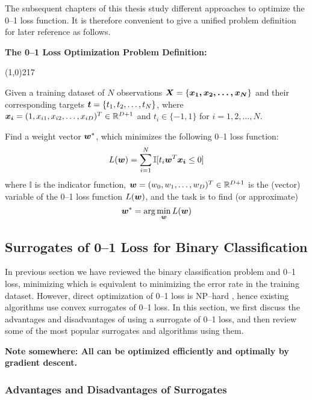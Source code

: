 The subsequent chapters of this thesis study different approaches to optimize the 0--1 loss function. It is therefore convenient to give a unified problem definition for later reference as follows.

\begin{framed}
\label{definition}
{\bf The 0--1 Loss Optimization Problem Definition:}

\line(1,0){217}

Given a training dataset of $N$ observations $\boldsymbol{X} = \{\boldsymbol{x_1, x_2, \dots, x_N}\}$ and their corresponding targets $\boldsymbol{t} = \{t_1, t_2, \dots, t_N\}$, where  $\boldsymbol{x_i} =  (1, x_{i1}, x_{i2}, \dots, x_{iD})^T \in \mathbb{R}^{D+1}$ and $t_i \in \{ -1, 1 \}$ for $i=1,2,\dots, N$. 

Find a weight vector $\boldsymbol{w}^*$, which minimizes the following 0--1 loss function:
\begin{equation}
\label{01loss}
L(\boldsymbol{w}) = \sum_{i=1}^N \mathbb{I} [t_i \boldsymbol{w}^T \boldsymbol{x_i} \leq 0]
\end{equation}
where $\mathbb{I}$ is the indicator function, ${\boldsymbol{w}} = (w_0, w_1, \dots, w_D)^T \in \mathbb{R}^{D+1}$ is the (vector) variable of the 0--1 loss function $L(\boldsymbol{w})$, and the task is to find (or approximate) 
$${\boldsymbol{w}}^* = \arg\min_{\boldsymbol{w}} L({\boldsymbol{w}})$$
\end{framed}

\subsection{Surrogates of 0--1 Loss for Binary Classification}
\label{sec:bgr.surrogates}

In previous section we have reviewed the binary classification problem and 0--1 loss, minimizing which is equivalent to minimizing the error rate in the training dataset. However, direct optimization of 0--1 loss is NP--hard \cite{Feldman,nphard}, hence existing algorithms use convex surrogates of 0--1 loss. In this section, we first discuss the advantages and disadvantages of using a surrogate of 0--1 loss, and then review some of the most popular  surrogates and algorithms using them\cite{McAllester,bishop06}.

{\bf Note somewhere: All can be optimized efficiently and optimally by gradient descent.}

\subsubsection{Advantages and Disadvantages of Surrogates}
\label{ssec:disadvantages}

